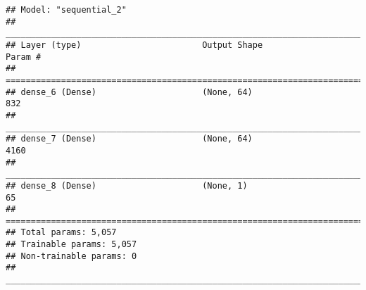 \documentclass[
]{article}
\newenvironment{Shaded}{\begin{snugshade}}{\end{snugshade}}
\newcommand{\CharTok}[1]{\textcolor[rgb]{0.31,0.60,0.02}{#1}}
\newcommand{\CommentTok}[1]{\textcolor[rgb]{0.56,0.35,0.01}{\textit{#1}}}
\newcommand{\ControlFlowTok}[1]{\textcolor[rgb]{0.13,0.29,0.53}{\textbf{#1}}}
\newcommand{\DataTypeTok}[1]{\textcolor[rgb]{0.13,0.29,0.53}{#1}}
\newcommand{\DecValTok}[1]{\textcolor[rgb]{0.00,0.00,0.81}{#1}}
\newcommand{\FloatTok}[1]{\textcolor[rgb]{0.00,0.00,0.81}{#1}}
\newcommand{\KeywordTok}[1]{\textcolor[rgb]{0.13,0.29,0.53}{\textbf{#1}}}
\newcommand{\NormalTok}[1]{#1}
\newcommand{\OperatorTok}[1]{\textcolor[rgb]{0.81,0.36,0.00}{\textbf{#1}}}
\newcommand{\StringTok}[1]{\textcolor[rgb]{0.31,0.60,0.02}{#1}}
\begin{document}
\begin{verbatim}
## Model: "sequential_2"
## ________________________________________________________________________________
## Layer (type)                        Output Shape                    Param #     
## ================================================================================
## dense_6 (Dense)                     (None, 64)                      832         
## ________________________________________________________________________________
## dense_7 (Dense)                     (None, 64)                      4160        
## ________________________________________________________________________________
## dense_8 (Dense)                     (None, 1)                       65          
## ================================================================================
## Total params: 5,057
## Trainable params: 5,057
## Non-trainable params: 0
## ________________________________________________________________________________
\end{verbatim}

\begin{Shaded}
\end{Shaded}
\end{document}
